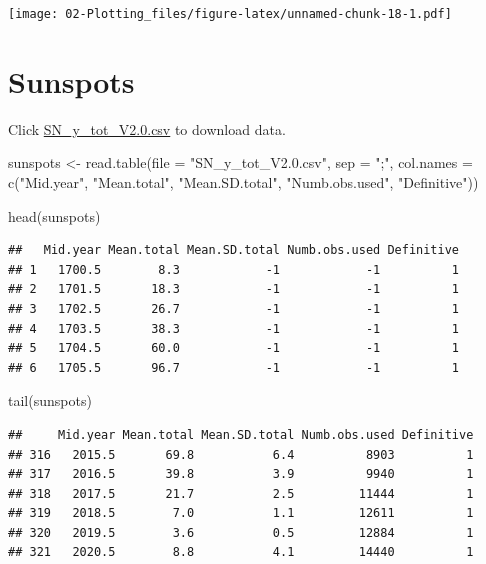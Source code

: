 \documentclass[
]{book}
\newenvironment{Shaded}{\begin{snugshade}}{\end{snugshade}}
\newcommand{\AttributeTok}[1]{\textcolor[rgb]{0.77,0.63,0.00}{#1}}
\newcommand{\FunctionTok}[1]{\textcolor[rgb]{0.00,0.00,0.00}{#1}}
\newcommand{\NormalTok}[1]{#1}
\newcommand{\OtherTok}[1]{\textcolor[rgb]{0.56,0.35,0.01}{#1}}
\newcommand{\StringTok}[1]{\textcolor[rgb]{0.31,0.60,0.02}{#1}}
\theoremstyle{definition}
\theoremstyle{definition}
\theoremstyle{definition}
\theoremstyle{definition}
\theoremstyle{remark}
\begin{document}
\texttt{[image: 02-Plotting\_files/figure-latex/unnamed-chunk-18-1.pdf]}

\hypertarget{sunspots}{%
\section{Sunspots}\label{sunspots}}

Click \href{http://www.chrisbilder.com/stat878/sections/2/SN_y_tot_V2.0.csv}{SN\_y\_tot\_V2.0.csv} to download data.

\begin{Shaded}
\begin{Highlighting}[]
\NormalTok{sunspots }\OtherTok{\textless{}{-}} \FunctionTok{read.table}\NormalTok{(}\AttributeTok{file =} \StringTok{"SN\_y\_tot\_V2.0.csv"}\NormalTok{, }\AttributeTok{sep =} 
    \StringTok{";"}\NormalTok{, }\AttributeTok{col.names =} \FunctionTok{c}\NormalTok{(}\StringTok{"Mid.year"}\NormalTok{, }\StringTok{"Mean.total"}\NormalTok{, }
   \StringTok{"Mean.SD.total"}\NormalTok{, }\StringTok{"Numb.obs.used"}\NormalTok{, }\StringTok{"Definitive"}\NormalTok{))}
\end{Highlighting}
\end{Shaded}

\begin{Shaded}
\begin{Highlighting}[]
\FunctionTok{head}\NormalTok{(sunspots)}
\end{Highlighting}
\end{Shaded}

\begin{verbatim}
##   Mid.year Mean.total Mean.SD.total Numb.obs.used Definitive
## 1   1700.5        8.3            -1            -1          1
## 2   1701.5       18.3            -1            -1          1
## 3   1702.5       26.7            -1            -1          1
## 4   1703.5       38.3            -1            -1          1
## 5   1704.5       60.0            -1            -1          1
## 6   1705.5       96.7            -1            -1          1
\end{verbatim}

\begin{Shaded}
\begin{Highlighting}[]
\FunctionTok{tail}\NormalTok{(sunspots)}
\end{Highlighting}
\end{Shaded}

\begin{verbatim}
##     Mid.year Mean.total Mean.SD.total Numb.obs.used Definitive
## 316   2015.5       69.8           6.4          8903          1
## 317   2016.5       39.8           3.9          9940          1
## 318   2017.5       21.7           2.5         11444          1
## 319   2018.5        7.0           1.1         12611          1
## 320   2019.5        3.6           0.5         12884          1
## 321   2020.5        8.8           4.1         14440          1
\end{verbatim}
\end{document}
